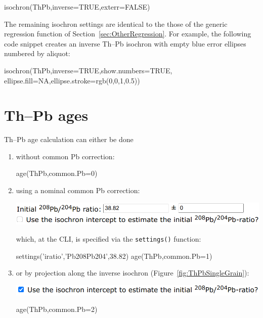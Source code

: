 \begin{refsection}
\begin{console}
isochron(ThPb,inverse=TRUE,exterr=FALSE)
\end{console}

The remaining isochron settings are identical to the those of the
generic regression function of Section~\ref{sec:OtherRegression}. For
example, the following code snippet creates an inverse Th--Pb isochron
with empty blue error ellipses numbered by aliquot:

\begin{script}
isochron(ThPb,inverse=TRUE,show.numbers=TRUE,
         ellipse.fill=NA,ellipse.stroke=rgb(0,0,1,0.5))
\end{script}

\section{Th--Pb ages}\label{sec:ThPbAges}

Th--Pb age calculation can either be done

\begin{enumerate}

\item without common Pb correction:

\begin{console}
age(ThPb,common.Pb=0)
\end{console}

\item using a nominal common Pb correction:

\noindent\includegraphics[width=.75\linewidth]{../figures/ThPbAgePb0.png}

\noindent which, at the CLI, is specified via the \texttt{settings()} function:

\begin{script}
settings('iratio','Pb208Pb204',38.82)
age(ThPb,common.Pb=1)
\end{script}

\item or by projection along the inverse isochron
  (Figure~\ref{fig:ThPbSingleGrain}):

\noindent\includegraphics[width=.75\linewidth]{../figures/ThPbAgei2i.png}

\begin{console}
age(ThPb,common.Pb=2)
\end{console}


\end{enumerate}
\end{refsection}
